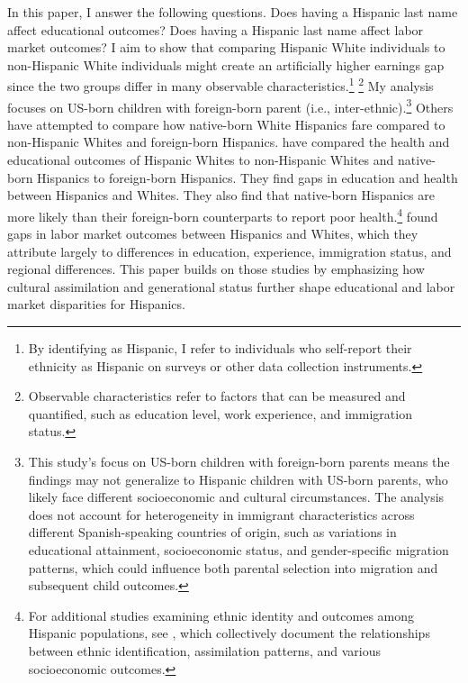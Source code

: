 In this paper, I answer the following questions. Does having a Hispanic last name affect educational outcomes? Does having a Hispanic last name affect labor market outcomes? I aim to show that comparing Hispanic White individuals to non-Hispanic White individuals might create an artificially higher earnings gap since the two groups differ in many observable characteristics.\footnote{By identifying as Hispanic, I refer to individuals who self-report their ethnicity as Hispanic on surveys or other data collection instruments.} \footnote{Observable characteristics refer to factors that can be measured and quantified, such as education level, work experience, and immigration status.} My analysis focuses on US-born children with foreign-born parent (i.e., inter-ethnic).\footnote{This study's focus on US-born children with foreign-born parents means the findings may not generalize to Hispanic children with US-born parents, who likely face different socioeconomic and cultural circumstances. The analysis does not account for heterogeneity in immigrant characteristics across different Spanish-speaking countries of origin, such as variations in educational attainment, socioeconomic status, and gender-specific migration patterns, which could influence both parental selection into migration and subsequent child outcomes.} Others have attempted to compare how native-born White Hispanics fare compared to non-Hispanic Whites and foreign-born Hispanics. \cites{antman2020ethnic} have compared the health and educational outcomes of Hispanic Whites to non-Hispanic Whites and native-born Hispanics to foreign-born Hispanics. They find gaps in education and health between Hispanics and Whites. They also find that native-born Hispanics are more likely than their foreign-born counterparts to report poor health.\footnote{For additional studies examining ethnic identity and outcomes among Hispanic populations, see \textcite{antman2020ethnic,antmanEthnicAttritionObserved2016,antmanEthnicAttritionObserved2016a,antmanEthnicAttritionAssimilation2020}, which collectively document the relationships between ethnic identification, assimilation patterns, and various socioeconomic outcomes.} \textcite{davilaChangesRelativeEarnings2008} found gaps in labor market outcomes between Hispanics and Whites, which they attribute largely to differences in education, experience, immigration status, and regional differences. This paper builds on those studies by emphasizing how cultural assimilation and generational status further shape educational and labor market disparities for Hispanics.

